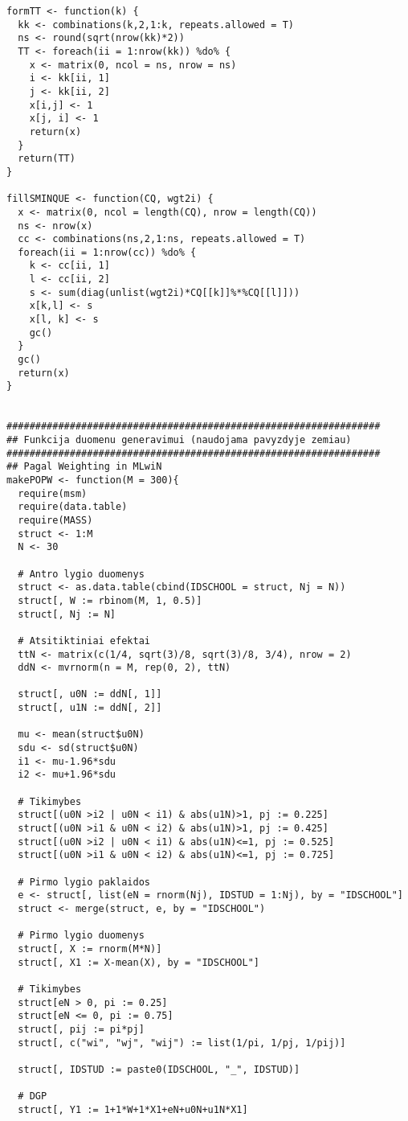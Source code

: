 \documentclass[11pt,a4paper]{article}
\begin{document}
\begin{appendix}
\begin{small}
\begin{verbatim}
formTT <- function(k) {
  kk <- combinations(k,2,1:k, repeats.allowed = T)
  ns <- round(sqrt(nrow(kk)*2))
  TT <- foreach(ii = 1:nrow(kk)) %do% {
    x <- matrix(0, ncol = ns, nrow = ns)
    i <- kk[ii, 1]
    j <- kk[ii, 2]
    x[i,j] <- 1
    x[j, i] <- 1
    return(x)
  }
  return(TT)
}

fillSMINQUE <- function(CQ, wgt2i) {
  x <- matrix(0, ncol = length(CQ), nrow = length(CQ))
  ns <- nrow(x)
  cc <- combinations(ns,2,1:ns, repeats.allowed = T)
  foreach(ii = 1:nrow(cc)) %do% {
    k <- cc[ii, 1]
    l <- cc[ii, 2]
    s <- sum(diag(unlist(wgt2i)*CQ[[k]]%*%CQ[[l]]))
    x[k,l] <- s
    x[l, k] <- s
    gc()
  }
  gc()
  return(x)
}


#################################################################
## Funkcija duomenu generavimui (naudojama pavyzdyje zemiau)
#################################################################
## Pagal Weighting in MLwiN
makePOPW <- function(M = 300){
  require(msm)
  require(data.table)
  require(MASS)
  struct <- 1:M
  N <- 30
  
  # Antro lygio duomenys
  struct <- as.data.table(cbind(IDSCHOOL = struct, Nj = N))
  struct[, W := rbinom(M, 1, 0.5)]
  struct[, Nj := N]
  
  # Atsitiktiniai efektai 
  ttN <- matrix(c(1/4, sqrt(3)/8, sqrt(3)/8, 3/4), nrow = 2)
  ddN <- mvrnorm(n = M, rep(0, 2), ttN)
  
  struct[, u0N := ddN[, 1]]
  struct[, u1N := ddN[, 2]]
  
  mu <- mean(struct$u0N)
  sdu <- sd(struct$u0N)
  i1 <- mu-1.96*sdu
  i2 <- mu+1.96*sdu
  
  # Tikimybes
  struct[(u0N >i2 | u0N < i1) & abs(u1N)>1, pj := 0.225]
  struct[(u0N >i1 & u0N < i2) & abs(u1N)>1, pj := 0.425]
  struct[(u0N >i2 | u0N < i1) & abs(u1N)<=1, pj := 0.525]
  struct[(u0N >i1 & u0N < i2) & abs(u1N)<=1, pj := 0.725]
  
  # Pirmo lygio paklaidos
  e <- struct[, list(eN = rnorm(Nj), IDSTUD = 1:Nj), by = "IDSCHOOL"]
  struct <- merge(struct, e, by = "IDSCHOOL")
  
  # Pirmo lygio duomenys
  struct[, X := rnorm(M*N)]
  struct[, X1 := X-mean(X), by = "IDSCHOOL"]
  
  # Tikimybes
  struct[eN > 0, pi := 0.25]
  struct[eN <= 0, pi := 0.75]
  struct[, pij := pi*pj]
  struct[, c("wi", "wj", "wij") := list(1/pi, 1/pj, 1/pij)]
  
  struct[, IDSTUD := paste0(IDSCHOOL, "_", IDSTUD)]
  
  # DGP
  struct[, Y1 := 1+1*W+1*X1+eN+u0N+u1N*X1]
  

\end{verbatim}
\end{small}
\end{appendix}
\end{document}
